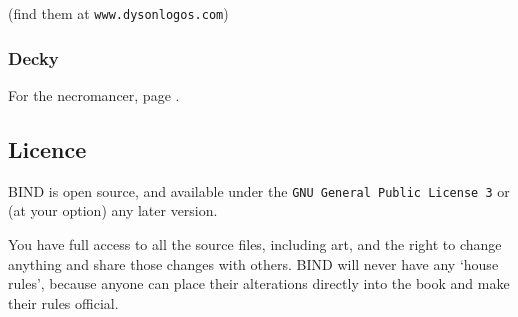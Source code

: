 \begin{multicols}{2}
(find them at {\tt www.dysonlogos.com})

\subsubsection{Decky}

For the necromancer, page \pageref{Decky/necromancer}.

\subsection*{Licence}

BIND is open source, and available under the {\tt GNU General Public License 3} or (at your option) any later version.

You have full access to all the source files, including art, and the right to change anything and share those changes with others.
BIND will never have any `house rules', because anyone can place their alterations directly into the book and make their rules official.

\end{multicols}
